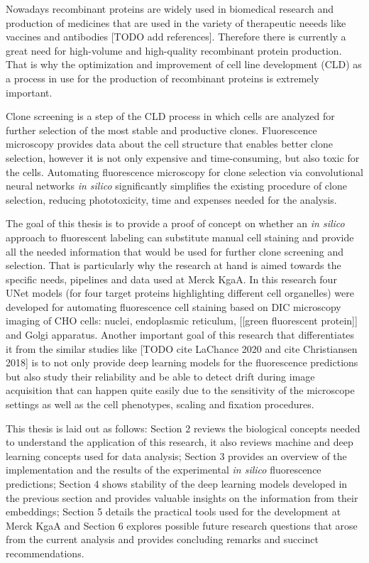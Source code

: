 Nowadays recombinant proteins are widely used in biomedical research and production of medicines that are used in the variety of therapeutic neeeds like vaccines and antibodies [TODO add references]. Therefore there is currently a great need for high-volume and high-quality recombinant protein production. That is why the optimization and improvement of cell line development (CLD) as a process in use for the production of recombinant proteins is extremely important.

Clone screening is a step of the CLD process in which cells are analyzed for further selection of the most stable and productive clones. Fluorescence microscopy provides data about the cell structure that enables better clone selection, however it is not only expensive and time-consuming, but also toxic for the cells. Automating fluorescence microscopy for clone selection via convolutional neural networks \textit{in silico} significantly simplifies the existing procedure of clone selection, reducing phototoxicity, time and expenses needed for the analysis.

The goal of this thesis is to provide a proof of concept on whether an \textit{in silico} approach to fluorescent labeling can substitute manual cell staining and provide all the needed information that would be used for further clone screening and selection. That is particularly why the research at hand is aimed towards the specific needs, pipelines and data used at Merck KgaA. In this research four UNet models (for four target proteins highlighting different cell organelles) were developed for automating fluorescence cell staining based on DIC microscopy imaging of CHO cells: nuclei, endoplasmic reticulum, [[green fluorescent protein]] and Golgi apparatus. Another important goal of this research that differentiates it from the similar studies like [TODO cite LaChance 2020 and cite Christiansen 2018] is to not only provide deep learning models for the fluorescence predictions but also study their reliability and be able to detect drift during image acquisition that can happen quite easily due to the sensitivity of the microscope settings as well as the cell phenotypes, scaling and fixation procedures.

This thesis is laid out as follows: Section 2 reviews the biological concepts needed to understand the application of this research, it also reviews machine and deep learning concepts used for data analysis; Section 3 provides an overview of the implementation and the results of the experimental \textit{in silico} fluorescence predictions; Section 4 shows stability of the deep learning models developed in the previous section and provides valuable insights on the information from their embeddings; Section 5 details the practical tools used for the development at Merck KgaA and Section 6 explores possible future research questions that arose from the current analysis and provides concluding remarks and succinct recommendations.
